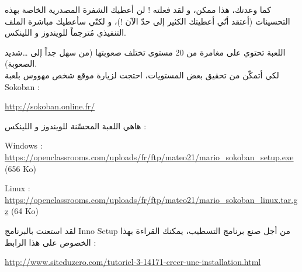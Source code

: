 كما وعدتك، هذا ممكن، و لقد فعلته ! 
لن أعطيك الشفرة المصدرية الخاصة بهذه التحسينات (أعتقد أنّي أعطيتك الكثير إلى حدّ الآن !)، و لكنّي سأعطيك مباشرة الملف التنفيذي مُترجماً للويندوز و اللينكس.

اللعبة تحتوي على مغامرة من 20 مستوى تختلف صعوبتها (من سهل جداً إلى \dots شديد الصعوبة). \\
لكي أتمكّن من تحقيق بعض المستويات، احتجت لزيارة موقع شخص مهووس بلعبة
\textenglish{Sokoban} :

\url{http://sokoban.online.fr/}

هاهي اللعبة المحسّنة للويندوز و اللينكس :

\textenglish{Windows : \url{https://openclassrooms.com/uploads/fr/ftp/mateo21/mario_sokoban_setup.exe} (656 Ko)}

\textenglish{Linux : \url{https://openclassrooms.com/uploads/fr/ftp/mateo21/mario_sokoban_linux.tar.gz} (64 Ko)}

لقد استعنت بالبرنامج
\textenglish{Inno Setup}
من أجل صنع برنامج التسطيب، يمكنك القراءة بهذا الخصوص على هذا الرابط :

\url{http://www.siteduzero.com/tutoriel-3-14171-creer-une-installation.html}
